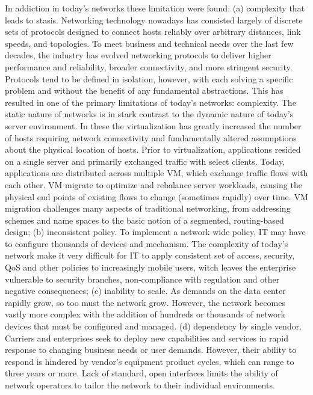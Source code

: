 In addiction in today's networks these limitation were found: (a) complexity that leads to stasis. Networking technology nowadays has consisted largely of discrete sets of protocols designed to connect hosts reliably over arbitrary distances, link speeds, and topologies. To meet business and technical needs over the last few decades, the industry has evolved networking protocols to deliver higher performance and reliability, broader connectivity, and more stringent security. Protocols tend to be defined in isolation, however, with each solving a specific problem and without the benefit of any fundamental abstractions. This has resulted in one of the primary limitations of today's networks: complexity. The static nature of networks is in stark contrast to the dynamic nature of today's server environment. In these the virtualization has greatly increased the number of hosts requiring network connectivity and fundamentally altered assumptions about the physical location of hosts. Prior to virtualization, applications resided on a single server and primarily exchanged traffic with select clients. Today, applications are distributed across multiple \ac{VM}, which exchange traffic flows with each other. \ac{VM} migrate to optimize and rebalance server workloads, causing the physical end points of existing flows to change (sometimes rapidly) over time. \ac{VM} migration challenges many aspects of traditional networking, from addressing schemes and name spaces to the basic notion of a segmented, routing-based design; (b) inconsistent policy. To implement a network wide policy, \ac{IT} may have to configure thousands of devices and mechanism. The complexity of today's network make it very difficult for \ac{IT} to apply consistent set of access, security, \ac{QoS} and other policies to increasingly mobile users, witch leaves the enterprise vulnerable to security branches, non-compliance with regulation and other negative consequences; (c) inability to scale. As demands on the data center rapidly grow, so too must the network grow. However, the network becomes vastly more complex with the addition of hundreds or thousands of network devices that must be configured and managed. (d) dependency by single vendor. Carriers and enterprises seek to deploy new capabilities and services in rapid response to changing business needs or user demands. However, their ability to respond is hindered by vendor's equipment product cycles, which can range to three years or more. Lack of standard, open interfaces limits the ability of network operators to tailor the network to their individual environments.

